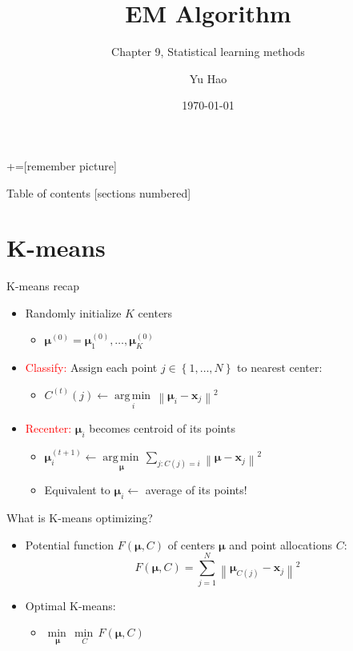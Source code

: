 \documentclass[12pt]{beamer}
\title{EM Algorithm}
\subtitle{Chapter 9, Statistical learning methods}
\date{\today}
\author{Yu Hao}
\institute{NaMI, Tongji University}
\newcommand{\norm}[1]{\left\lVert#1\right\rVert}
\newcommand{\argmin}[1]{\underset{#1}{\operatorname*{arg\,min\,}}}
\newcommand{\undermin}[1]{\underset{#1}{\operatorname*{min\,}}}
\begin{document}
+=[remember picture]
\everymath{\displaystyle}

\maketitle

\begin{frame}{Table of contents}
[sections numbered]
\tableofcontents[hideallsubsections]
\end{frame}

\section{K-means}
\begin{frame}{K-means recap}
\begin{itemize}
	\item Randomly initialize $K$ centers 
	\begin{itemize}
		\item $\bm{\mu}^{(0)}=\bm{\mu}_{1}^{(0)},\ldots,\bm{\mu}_{K}^{(0)}$
	\end{itemize}
	\item \textcolor{red}{Classify:} Assign each point $j\in{\left\{ 1,\ldots,N \right\}}$ to nearest center:
	\begin{itemize}
		\item $C^{(t)}(j) \leftarrow \argmin{i} \norm{\bm{\mu}_i-\bm{x}_j}^2$
	\end{itemize}
	\item \textcolor{red}{Recenter:} $\bm{\mu}_i$ becomes centroid of its points
	\begin{itemize}
		\item $\bm{\mu}_{i}^{(t+1)}\leftarrow\argmin{\bm{\mu}}\sum_{j: C(j)=i} \norm{\bm{\mu}-\bm{x}_{j}}^2$
		\item Equivalent to $\bm{\mu}_i \leftarrow$ average of its points!
	\end{itemize}
\end{itemize}
\end{frame}

\begin{frame}{What is K-means optimizing?}
\begin{itemize}
	\item Potential function $F(\bm{\mu},C)$ of centers $\bm{\mu}$ and point allocations $C$:
	\begin{equation}
	F(\bm{\mu},C)=\sum_{j=1}^{N} \norm{\bm{\mu}_{C(j)}-\bm{x}_j}^2
	\end{equation}
	\item Optimal K-means:
	\begin{itemize}
		\item $\undermin{\bm{\mu}}\undermin{C}F(\bm{\mu},C)$
	\end{itemize}
\end{itemize}
\end{frame}
\end{document}
